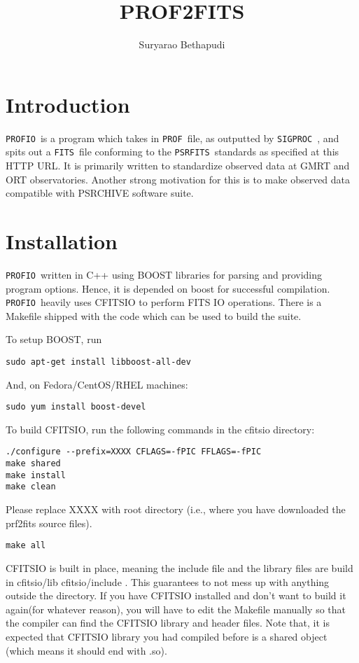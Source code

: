 \documentclass{article}
\newcommand{\prf}{\texttt{PROFIO}\ }
\newcommand{\prof}{\texttt{PROF}\ }
\newcommand{\sigproc}{\texttt{SIGPROC}\ }
\newcommand{\fits}{\texttt{FITS}\ }
\newcommand{\psrfits}{\texttt{PSRFITS}\ }
\begin{document}


\title{PROF2FITS}
\date{}
\author{Suryarao Bethapudi}
\maketitle
\section*{\hfill Introduction}

\par \prf is a program which takes in \prof file, as outputted by \sigproc, and spits out a \fits file conforming to the \psrfits standards as specified at this HTTP URL. It is primarily written to standardize observed data at GMRT and ORT observatories. Another strong motivation for this is to make observed data compatible with PSRCHIVE software suite. 

\section*{\hfill Installation}

\par \prf written in C++ using BOOST libraries for parsing and providing program options. Hence, it is depended on boost for successful compilation. \prf heavily uses CFITSIO to perform FITS IO operations. There is a Makefile shipped with the code which can be used to build the suite. 

\par To setup BOOST, run 
\begin{lstlisting}
sudo apt-get install libboost-all-dev
\end{lstlisting}
And, on Fedora/CentOS/RHEL machines:
\begin{lstlisting}
sudo yum install boost-devel
\end{lstlisting}
\par To build CFITSIO, run the following commands in the cfitsio directory:  
\begin{lstlisting}
./configure --prefix=XXXX CFLAGS=-fPIC FFLAGS=-fPIC
make shared 
make install
make clean
\end{lstlisting}
Please replace XXXX with root directory (i.e., where you have downloaded the prf2fits source files). 
\begin{lstlisting}
make all 
\end{lstlisting}
\par CFITSIO is built in place, meaning the include file and the library files are build in cfitsio/lib cfitsio/include . This guarantees to not mess up with anything outside the directory. If you have CFITSIO installed and don't want to build it again(for whatever reason), you will have to edit the Makefile manually so that the compiler can find the CFITSIO library and header files. Note that, it is expected that CFITSIO library you had compiled before is a shared object (which means it should end with .so). 
\end{document}
